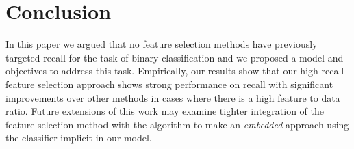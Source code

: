 \section{Conclusion}

In this paper we argued that no feature selection methods have
previously targeted recall for the task of binary classification and
we proposed a model and objectives to address this task.  Empirically,
our results show that our high recall feature selection approach shows
strong performance on recall with significant improvements over other
methods in cases where there is a high feature to data ratio.
Future extensions of this work may examine tighter integration of the
feature selection method with the algorithm to make an \emph{embedded}
approach 
using the classifier implicit in our model.

